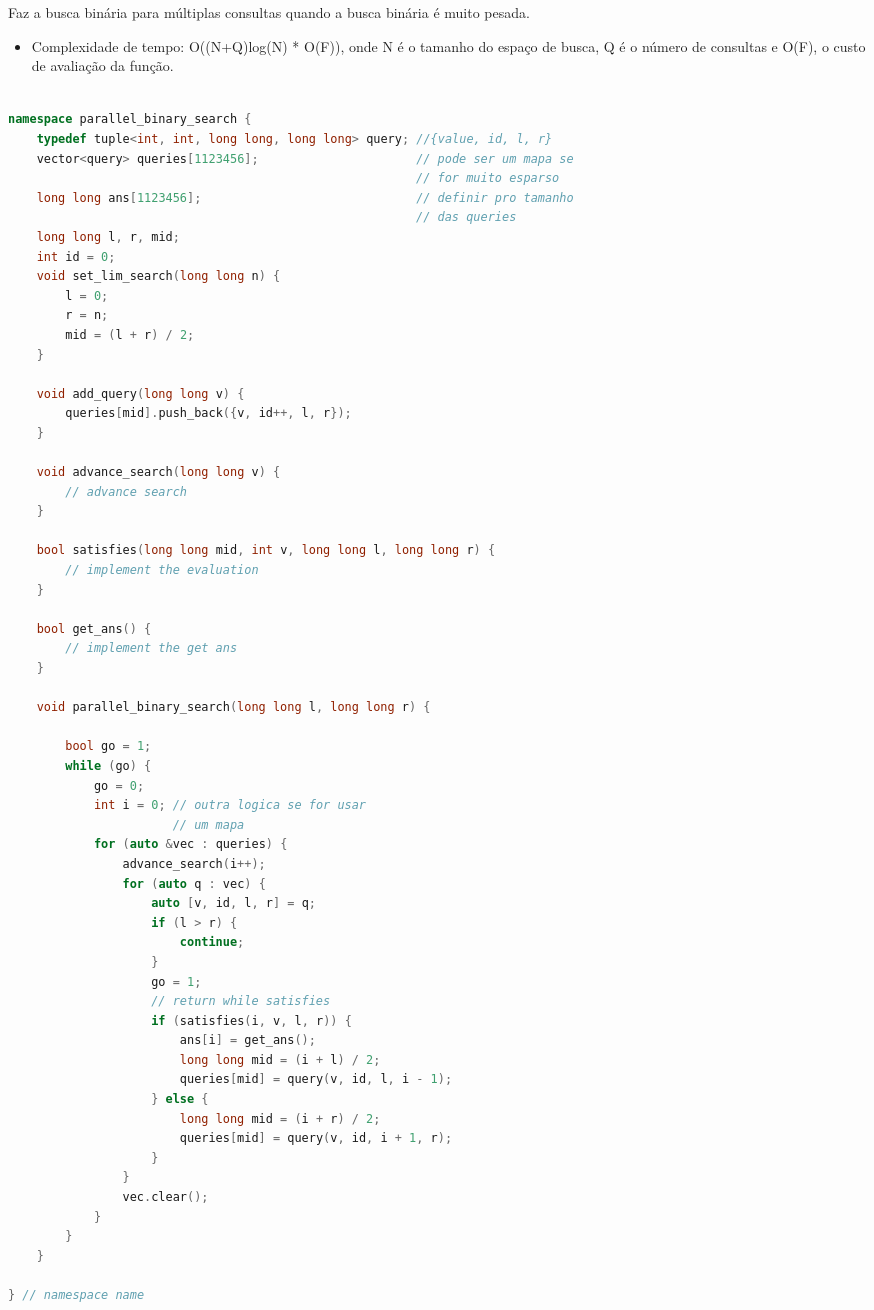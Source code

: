 \documentclass[11pt, a4paper, oneside]{book}
\begin{document}
Faz a busca binária para múltiplas consultas quando a busca binária é muito pesada.



\begin{itemize}
\item Complexidade de tempo: O((N+Q)log(N) * O(F)), onde N é o tamanho do espaço de busca, Q é o número de consultas e O(F), o custo de avaliação da função.
\end{itemize}

\hfill

\begin{multicols}{2}
\begin{lstlisting}[language=C++]

namespace parallel_binary_search {
    typedef tuple<int, int, long long, long long> query; //{value, id, l, r}
    vector<query> queries[1123456];                      // pode ser um mapa se
                                                         // for muito esparso
    long long ans[1123456];                              // definir pro tamanho
                                                         // das queries
    long long l, r, mid;
    int id = 0;
    void set_lim_search(long long n) {
        l = 0;
        r = n;
        mid = (l + r) / 2;
    }

    void add_query(long long v) {
        queries[mid].push_back({v, id++, l, r});
    }

    void advance_search(long long v) {
        // advance search
    }

    bool satisfies(long long mid, int v, long long l, long long r) {
        // implement the evaluation
    }

    bool get_ans() {
        // implement the get ans
    }

    void parallel_binary_search(long long l, long long r) {

        bool go = 1;
        while (go) {
            go = 0;
            int i = 0; // outra logica se for usar
                       // um mapa
            for (auto &vec : queries) {
                advance_search(i++);
                for (auto q : vec) {
                    auto [v, id, l, r] = q;
                    if (l > r) {
                        continue;
                    }
                    go = 1;
                    // return while satisfies
                    if (satisfies(i, v, l, r)) {
                        ans[i] = get_ans();
                        long long mid = (i + l) / 2;
                        queries[mid] = query(v, id, l, i - 1);
                    } else {
                        long long mid = (i + r) / 2;
                        queries[mid] = query(v, id, i + 1, r);
                    }
                }
                vec.clear();
            }
        }
    }

} // namespace name
\end{lstlisting}
\end{multicols}
\end{document}
